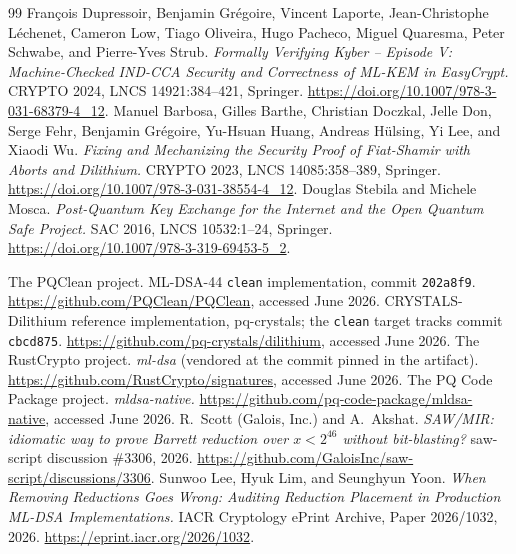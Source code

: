 \documentclass[11pt]{article}
\newcommand{\code}[1]{\texttt{#1}}
\begin{document}
\begin{thebibliography}{99}
  Fran\c{c}ois Dupressoir, Benjamin Gr\'egoire, Vincent Laporte, Jean-Christophe L\'echenet, Cameron
  Low, Tiago Oliveira, Hugo Pacheco, Miguel Quaresma, Peter Schwabe, and Pierre-Yves Strub.
  \emph{Formally Verifying Kyber -- Episode V: Machine-Checked IND-CCA Security and Correctness of
  ML-KEM in EasyCrypt.} CRYPTO 2024, LNCS 14921:384--421, Springer.
  \url{https://doi.org/10.1007/978-3-031-68379-4_12}.
 Manuel Barbosa, Gilles Barthe, Christian Doczkal, Jelle Don, Serge Fehr,
  Benjamin Gr\'egoire, Yu-Hsuan Huang, Andreas H\"ulsing, Yi Lee, and Xiaodi Wu. \emph{Fixing and
  Mechanizing the Security Proof of Fiat-Shamir with Aborts and Dilithium.} CRYPTO 2023,
  LNCS 14085:358--389, Springer. \url{https://doi.org/10.1007/978-3-031-38554-4_12}.
 Douglas Stebila and Michele Mosca. \emph{Post-Quantum Key Exchange for the Internet
  and the Open Quantum Safe Project.} SAC 2016, LNCS 10532:1--24, Springer.
  \url{https://doi.org/10.1007/978-3-319-69453-5_2}.

 The PQClean project. ML-DSA-44 \code{clean} implementation, commit
  \texttt{202a8f9}. \url{https://github.com/PQClean/PQClean}, accessed June 2026.
 CRYSTALS-Dilithium reference implementation, pq-crystals; the \code{clean} target
  tracks commit \texttt{cbcd875}. \url{https://github.com/pq-crystals/dilithium}, accessed June 2026.
 The RustCrypto project. \emph{ml-dsa} (vendored at the commit pinned in the
  artifact). \url{https://github.com/RustCrypto/signatures}, accessed June 2026.
 The PQ Code Package project. \emph{mldsa-native.}
  \url{https://github.com/pq-code-package/mldsa-native}, accessed June 2026.
 R.\ Scott (Galois, Inc.) and A.\ Akshat. \emph{SAW/MIR: idiomatic way to prove
  Barrett reduction over $x < 2^{46}$ without bit-blasting?} saw-script discussion \#3306, 2026.
  \url{https://github.com/GaloisInc/saw-script/discussions/3306}.
 Sunwoo Lee, Hyuk Lim, and Seunghyun Yoon.
  \emph{When Removing Reductions Goes Wrong: Auditing Reduction Placement in Production ML-DSA
  Implementations.} IACR Cryptology ePrint Archive, Paper 2026/1032, 2026.
  \url{https://eprint.iacr.org/2026/1032}.
\end{thebibliography}
\end{document}
